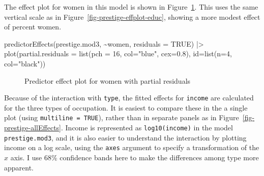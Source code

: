 \documentclass[
  letterpaper,
  10pt,
  krantz2]{krantz}
\makeatletter
\newenvironment{Shaded}{\begin{snugshade}}{\end{snugshade}}
\newcommand{\AttributeTok}[1]{\textcolor[rgb]{0.40,0.45,0.13}{#1}}
\newcommand{\ConstantTok}[1]{\textcolor[rgb]{0.56,0.35,0.01}{#1}}
\newcommand{\DecValTok}[1]{\textcolor[rgb]{0.68,0.00,0.00}{#1}}
\newcommand{\FloatTok}[1]{\textcolor[rgb]{0.68,0.00,0.00}{#1}}
\newcommand{\FunctionTok}[1]{\textcolor[rgb]{0.28,0.35,0.67}{#1}}
\newcommand{\NormalTok}[1]{\textcolor[rgb]{0.00,0.23,0.31}{#1}}
\newcommand{\SpecialCharTok}[1]{\textcolor[rgb]{0.37,0.37,0.37}{#1}}
\newcommand{\StringTok}[1]{\textcolor[rgb]{0.13,0.47,0.30}{#1}}
\newenvironment{kframe}{%
  \medskip{}
  \setlength{\fboxsep}{.8em}
  \def\at@end@of@kframe{}%
  \ifinner\ifhmode%
  \def\at@end@of@kframe{\end{minipage}}%
  \begin{minipage}{\columnwidth}%
  \fi\fi%
  \def\FrameCommand##1{\hskip\@totalleftmargin \hskip-\fboxsep
  \colorbox{shadecolor}{##1}\hskip-\fboxsep
      \hskip-\linewidth \hskip-\@totalleftmargin \hskip\columnwidth}%
  \MakeFramed {\advance\hsize-\width
    \@totalleftmargin\z@ \linewidth\hsize
    \@setminipage}}%
{\par\unskip\endMakeFramed%
  \at@end@of@kframe}
\renewenvironment{Shaded}{\begin{kframe}}{\end{kframe}}
\makeatother
\begin{document}
The effect plot for women in this model is shown in
Figure~\ref{fig-prestige-effplot-women}. This uses the same vertical
scale as in Figure~\ref{fig-prestige-effplot-educ}, showing a more
modest effect of percent women.

\begin{Shaded}
\begin{Highlighting}[]
\FunctionTok{predictorEffects}\NormalTok{(prestige.mod3, }\SpecialCharTok{\textasciitilde{}}\NormalTok{women,}
                 \AttributeTok{residuals =} \ConstantTok{TRUE}\NormalTok{) }\SpecialCharTok{|\textgreater{}}
  \FunctionTok{plot}\NormalTok{(}\AttributeTok{partial.residuals =} \FunctionTok{list}\NormalTok{(}\AttributeTok{pch =} \DecValTok{16}\NormalTok{, }\AttributeTok{col=}\StringTok{"blue"}\NormalTok{, }\AttributeTok{cex=}\FloatTok{0.8}\NormalTok{),}
       \AttributeTok{id=}\FunctionTok{list}\NormalTok{(}\AttributeTok{n=}\DecValTok{4}\NormalTok{, }\AttributeTok{col=}\StringTok{"black"}\NormalTok{))}
\end{Highlighting}
\end{Shaded}

\begin{figure}[H]


\caption{\label{fig-prestige-effplot-women}Predictor effect plot for
women with partial residuals}

\end{figure}%

Because of the interaction with \texttt{type}, the fitted effects for
\texttt{income} are calculated for the three types of occupation. It is
easiest to compare these in the a single plot (using
\texttt{multiline\ =\ TRUE}), rather than in separate panels as in
Figure~\ref{fig-prestige-allEffects}. Income is represented as
\texttt{log10(income)} in the model \texttt{prestige.mod3}, and it is
also easier to understand the interaction by plotting income on a log
scale, using the \texttt{axes} argument to specify a transformation of
the \(x\) axis. I use 68\% confidence bands here to make the differences
among type more apparent.
\end{document}
